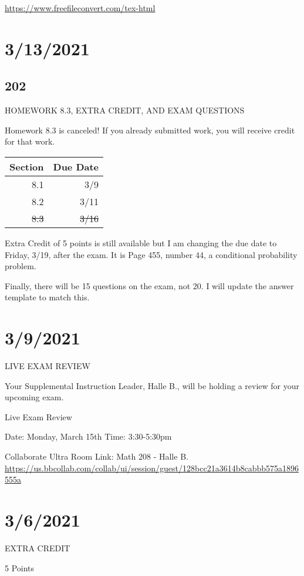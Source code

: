 \documentclass[]{article}
\begin{document}
	
\url{https://www.freefileconvert.com/tex-html}



\section*{3/13/2021}
\subsection*{202}
HOMEWORK 8.3, EXTRA CREDIT, AND EXAM QUESTIONS

Homework 8.3 is canceled! If you already submitted work, you will receive credit for that work.

\bgroup
\def\arraystretch{1.5}
\begin{tabular}{|r|r|}
	\hline
	Section & Due Date \\
	\hline
	8.1 & 3/9 \\
	\hline
	8.2 & 3/11 \\
	\hline
	\sout{8.3} & \sout{3/16} \\
	\hline
\end{tabular}
\egroup

Extra Credit of 5 points is still available but I am changing the due date to Friday, 3/19, after the exam. It is Page 455, number 44, a conditional probability problem.

Finally, there will be 15 questions on the exam, not 20. I will update the answer template to match this.



\section*{3/9/2021}
LIVE EXAM REVIEW

Your Supplemental Instruction Leader, Halle B., will be holding a review for your upcoming exam.

Live Exam Review 

Date: Monday, March 15th
Time: 3:30-5:30pm

Collaborate Ultra Room Link: Math 208 - Halle B.
\url{https://us.bbcollab.com/collab/ui/session/guest/128bcc21a3614b8cabbb575a1896555a}



\section*{3/6/2021}
EXTRA CREDIT

5 Points
\end{document}
